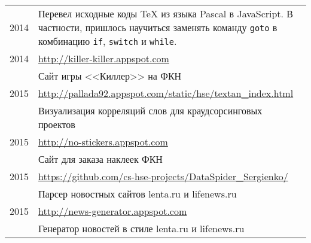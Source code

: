 \documentclass[11pt]{article}
\begin{document}
\begin{tabular}{r p{11.5cm}}

\footnotesize{2014} & Перевел исходные коды TeX из языка Pascal в JavaScript. В частности, пришлось научиться заменять команду \texttt{goto} в комбинацию \texttt{if}, \texttt{switch} и \texttt{while}. \\

\footnotesize{2014} & \url{http://killer-killer.appspot.com}\\
& Сайт игры <<Киллер>> на ФКН \\

\footnotesize{2015} & \url{http://pallada92.appspot.com/static/hse/textan_index.html}\\
& Визуализация корреляций слов для краудсорсинговых проектов \\

\footnotesize{2015} & \url{http://no-stickers.appspot.com}\\
& Сайт для заказа наклеек ФКН \\

\footnotesize{2015} & \url{https://github.com/cs-hse-projects/DataSpider_Sergienko/}\\
& Парсер новостных сайтов lenta.ru и lifenews.ru \\

\footnotesize{2015} & \url{http://news-generator.appspot.com}\\
& Генератор новостей в стиле lenta.ru и lifenews.ru \\

\end{tabular}
\end{document}
